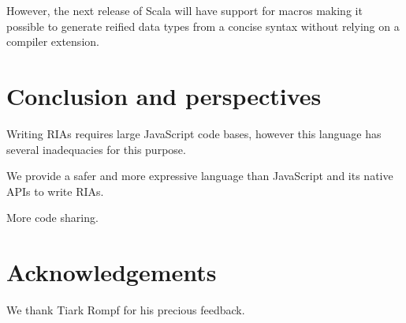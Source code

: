 \documentclass[american,english,runningheads]{llncs}
\begin{document}
However, the next release of Scala will have support for macros making it possible to generate reified data types
from a concise syntax without relying on a compiler extension.

\section{Conclusion and perspectives}
\label{discussion}

Writing RIAs requires large JavaScript code bases, however this language has several inadequacies for this purpose.

We provide a safer and more expressive language than JavaScript and its native APIs to write RIAs.

More code sharing.

\section{Acknowledgements}

We thank Tiark Rompf for his precious feedback.



\end{document}
